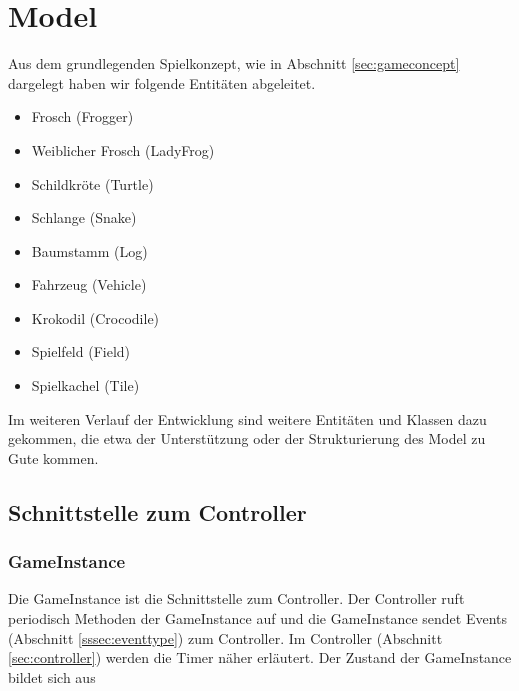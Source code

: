 \documentclass[a4paper,10pt]{report}
\begin{document}
    
    \section{Model}
    {
    	\label{sec:model}
    	Aus dem grundlegenden Spielkonzept, wie in Abschnitt \ref{sec:gameconcept} dargelegt haben wir folgende Entitäten abgeleitet.
    	
    	\begin{itemize}
    		\item Frosch (Frogger)
    		\item Weiblicher Frosch (LadyFrog)
    		\item Schildkröte (Turtle)
    		\item Schlange (Snake)
    		\item Baumstamm (Log)
    		\item Fahrzeug (Vehicle)
    		\item Krokodil (Crocodile)
    		\item Spielfeld (Field)
    		\item Spielkachel (Tile)
    	\end{itemize}
    	
    	\noindent
		Im weiteren Verlauf der Entwicklung sind weitere Entitäten und Klassen dazu gekommen, die etwa der Unterstützung oder der Strukturierung des Model zu Gute kommen.
		
		\newpage
		\subsection{Schnittstelle zum Controller}
		{
			\subsubsection{GameInstance}
			{
				\label{sssec:gameinstance}
				Die GameInstance ist die Schnittstelle zum Controller. Der Controller ruft periodisch Methoden der GameInstance auf und 
				die GameInstance sendet Events (Abschnitt \ref{sssec:eventtype}) zum Controller. Im Controller (Abschnitt \ref{sec:controller}) werden die Timer näher erläutert.
				\newline \newline		
				Der Zustand der GameInstance bildet sich aus 
				
}}}
\end{document}
